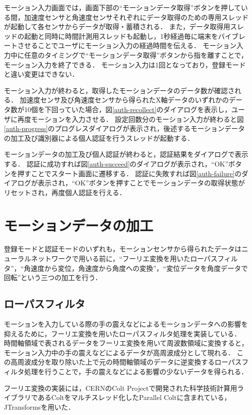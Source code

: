 モーション入力画面では，画面下部の``モーションデータ取得''ボタンを押している間，加速度センサと角速度センサそれぞれにデータ取得のための専用スレッドが起動して各センサからデータが取得・蓄積される．
また，データ取得用スレッドの起動と同時に時間計測用スレッドも起動し，1秒経過毎に端末をバイブレートさせることでユーザにモーション入力の経過時間を伝える．
モーション入力中に任意のタイミングで``モーションデータ取得''ボタンから指を離すことで，モーション入力を終了できる．
モーション入力は1回となっており，登録モードと違い変更はできない．

モーション入力が終わると，取得したモーションデータのデータ数が確認される．
加速度センサ及び角速度センサから得られたX軸データのいずれかのデータ数が10個を下回っていた場合，図\ref{auth-recollect}のダイアログを表示し，ユーザに再度モーションを入力させる．
設定回数分のモーション入力が終わると図\ref{auth-progress}のプログレスダイアログが表示され，後述するモーションデータの加工及び識別器による個人認証を行うスレッドが起動する．

モーションデータの加工及び個人認証が終わると，認証結果をダイアログで表示する．
認証に成功すれば図\ref{auth-succeed}のダイアログが表示され，``OK''ボタンを押すことでスタート画面に遷移する．
認証に失敗すれば図\ref{auth-failure}のダイアログが表示され，``OK''ボタンを押すことでモーションデータの取得状態がリセットされ，再度個人認証を行える．

\section{モーションデータの加工}
登録モードと認証モードのいずれも，モーションセンサから得られたデータはニューラルネットワークで用いる前に，``フーリエ変換を用いたローパスフィルタ''，``角速度から変位，角速度から角度への変換''，``変位データを角度データで回転''という三つの加工を行う．

\subsection{ローパスフィルタ}
モーションを入力している際の手の震えなどによるモーションデータへの影響を抑えるために，フーリエ変換を用いたローパスフィルタ処理を実装している．
時間軸領域で表されるデータをフーリエ変換を用いて周波数領域に変換すると，モーション入力中の手の震えなどによるデータが高周波成分として現れる．
この高周波成分を取り除いた上で元の時間軸領域のデータに逆変換するローパスフィルタ処理を行うことで，手の震えなどによる影響の少ないデータを得られる．

フーリエ変換の実装には，CERNのColt Project\cite{4-colt-project}で開発された科学技術計算用ライブラリであるColtをマルチスレッド化したParallel Colt\cite{4-parallel-colt}に含まれている，JTransforms\cite{4-jtransforms}を用いた．


